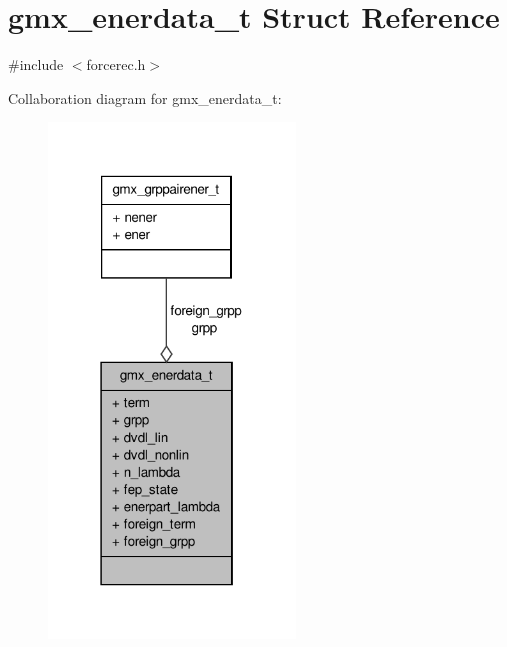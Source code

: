 \hypertarget{structgmx__enerdata__t}{\section{gmx\-\_\-enerdata\-\_\-t \-Struct \-Reference}
\label{structgmx__enerdata__t}
}


{\ttfamily \#include $<$forcerec.\-h$>$}



\-Collaboration diagram for gmx\-\_\-enerdata\-\_\-t\-:
\nopagebreak
\begin{figure}[H]
\begin{center}
\leavevmode
\includegraphics[width=186pt]{structgmx__enerdata__t__coll__graph}
\end{center}
\end{figure}
